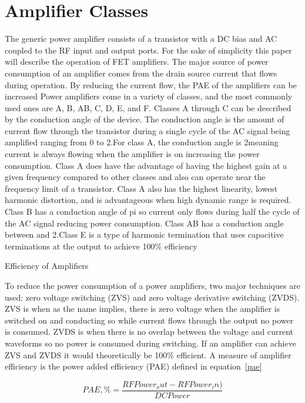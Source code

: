 \section{Amplifier Classes}

The generic power amplifier consists of a transistor with a DC bias and AC coupled to the RF input and output ports. For the sake of simplicity this paper will describe the operation of FET amplifiers. The major source of power consumption of an amplifier comes from the drain source current that flows during operation. By reducing the current flow, the PAE of the amplifiers can be increased
Power amplifiers come in a variety of classes, and the most commonly used ones are A, B, AB, C, D, E, and F. Classes A through C can be described by the conduction angle of the device. The conduction angle is the amount of current flow through the transistor during a single cycle of the AC signal being amplified ranging from 0 to 2.\pi For class A, the conduction angle is 2\pi meaning current is always flowing when the amplifier is on increasing the power consumption. Class A does have the advantage of having the highest gain at a given frequency compared to other classes and also can operate near the frequency limit of a transistor. Class A also has the highest linearity, lowest harmonic distortion, and is advantageous when high dynamic range is required. Class B has a conduction angle of pi so current only flows during half the cycle of the AC signal reducing power consumption. Class AB has a conduction angle between \pi and 2.\pi Class E is a type of harmonic termination that uses capacitive terminations at the output to achieve 100\% efficiency

Efficiency of Amplifiers

To reduce the power consumption of a power amplifiers, two major techniques are used: zero voltage switching (ZVS) and zero voltage derivative switching (ZVDS). ZVS is when as the name implies, there is zero voltage when the amplifier is switched on and conducting so while current flows through the output no power is consumed. ZVDS is when there is no overlap between the voltage and current waveforms so no power is consumed during switching. If an amplifier can achieve ZVS and ZVDS it would theoretically be 100\% efficient. A measure of amplifier efficiency is the power added efficiency (PAE) defined in equation~\ref{pae} 

\begin{equation}\label{pae}
  PAE,\% = \frac{RF Power_out - RF Power_in)}{DC Power}
\end{equation}


